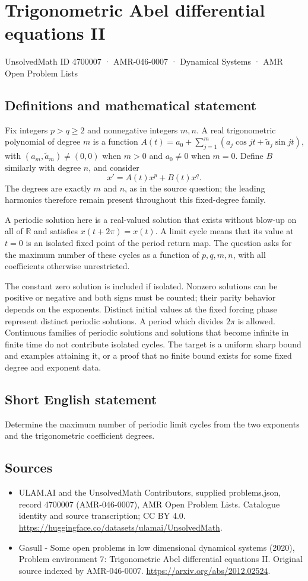\documentclass[11pt,a4paper]{article}
\begin{document}
\section*{Trigonometric Abel differential equations II}\label{4700007}
{\small UnsolvedMath ID 4700007 · AMR-046-0007 · Dynamical Systems · AMR Open Problem Lists}
\subsection{Definitions and mathematical statement}
Fix integers $p>q\ge2$ and nonnegative integers $m,n$. A real trigonometric
polynomial of degree $m$ is a function
$A(t)=a_0+\sum_{j=1}^m(a_j\cos jt+\widetilde a_j\sin jt)$,
with $(a_m,\widetilde a_m)\ne(0,0)$ when $m>0$ and $a_0\ne0$ when $m=0$.
Define $B$ similarly with degree $n$, and consider
\[
 x'=A(t)x^p+B(t)x^q.
\]
The degrees are exactly $m$ and $n$, as in the source question; the leading
harmonics therefore remain present throughout this fixed-degree family.

A periodic solution here is a real-valued solution that exists without
blow-up on all of $\mathbb R$ and satisfies $x(t+2\pi)=x(t)$. A limit cycle
means that its value at $t=0$ is an isolated fixed point of the period return
map. The question asks for the maximum number of these cycles as a function
of $p,q,m,n$, with all coefficients otherwise unrestricted.

The constant zero solution is included if isolated. Nonzero solutions can
be positive or negative and both signs must be counted; their parity
behavior depends on the exponents. Distinct initial values at the fixed
forcing phase represent distinct periodic solutions. A period which divides
$2\pi$ is allowed. Continuous families of periodic solutions and solutions
that become infinite in finite time do not contribute isolated cycles.
The target is a uniform sharp bound and examples attaining it, or a proof
that no finite bound exists for some fixed degree and exponent data.
\subsection{Short English statement}
Determine the maximum number of periodic limit cycles from the two exponents and the trigonometric coefficient degrees.
\subsection{Sources}
\begin{itemize}
\item[S1] ULAM.AI and the UnsolvedMath Contributors, supplied problems.json, record 4700007 (AMR-046-0007), AMR Open Problem Lists. Catalogue identity and source transcription; CC BY 4.0.
\url{https://huggingface.co/datasets/ulamai/UnsolvedMath}.
\item[S2] Gasull - Some open problems in low dimensional dynamical systems (2020), Problem environment 7: Trigonometric Abel differential equations II. Original source indexed by AMR-046-0007.
\url{https://arxiv.org/abs/2012.02524}.
\end{itemize}
\end{document}
